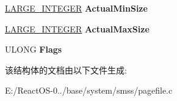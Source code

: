 \begin{DoxyCompactItemize}
\item 
\mbox{\label{struct___s_m_p___p_a_g_e_f_i_l_e___d_e_s_c_r_i_p_t_o_r_a31ffb6de66bb01f46334ef67192ae82b}} 
\hyperlink{union___l_a_r_g_e___i_n_t_e_g_e_r}{L\+A\+R\+G\+E\+\_\+\+I\+N\+T\+E\+G\+ER} {\bfseries Actual\+Min\+Size}
\item 
\mbox{\label{struct___s_m_p___p_a_g_e_f_i_l_e___d_e_s_c_r_i_p_t_o_r_a7c2054a34f3bffff30bcf0d3b0b83283}} 
\hyperlink{union___l_a_r_g_e___i_n_t_e_g_e_r}{L\+A\+R\+G\+E\+\_\+\+I\+N\+T\+E\+G\+ER} {\bfseries Actual\+Max\+Size}
\item 
\mbox{\label{struct___s_m_p___p_a_g_e_f_i_l_e___d_e_s_c_r_i_p_t_o_r_a34eeb0f94a9fdf9aca530f7d9dde64f4}} 
U\+L\+O\+NG {\bfseries Flags}
\end{DoxyCompactItemize}


该结构体的文档由以下文件生成\+:\begin{DoxyCompactItemize}
\item 
E\+:/\+React\+O\+S-\/0../base/system/smss/pagefile.\+c\end{DoxyCompactItemize}
